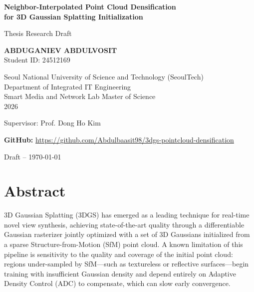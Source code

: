 \documentclass[12pt, a4paper]{article}
\begin{document}
\onehalfspacing

\begin{titlepage}
\centering
\vspace*{2cm}

{\Large\bfseries\color{seoulblue}
Neighbor-Interpolated Point Cloud Densification\\[0.5em]
for 3D Gaussian Splatting Initialization}

\vspace{1.5cm}
{\large Thesis Research Draft}

\vspace{2cm}
{\Large\bfseries ABDUGANIEV ABDULVOSIT}\\[0.5em]
{\normalsize Student ID: 24512169}

\vspace{1cm}
{\normalsize
Seoul National University of Science and Technology (SeoulTech)\\
Department of Integrated IT Engineering\\Smart Media and Network Lab
Master of Science\\
2026}

\vspace{1.5cm}
{\normalsize Supervisor: Prof. Dong Ho Kim}

\vspace{2cm}
{\normalsize
\textbf{GitHub:}
\url{https://github.com/Abdulbaasit98/3dgs-pointcloud-densification}}

\vfill
{\small Draft -- \today}
\end{titlepage}

\tableofcontents
\newpage

\section*{Abstract}

3D Gaussian Splatting (3DGS) has emerged as a leading technique for real-time novel
view synthesis, achieving state-of-the-art quality through a differentiable Gaussian
rasterizer jointly optimized with a set of 3D Gaussians initialized from a sparse
Structure-from-Motion (SfM) point cloud. A known limitation of this pipeline is
sensitivity to the quality and coverage of the initial point cloud: regions
under-sampled by SfM---such as textureless or reflective surfaces---begin training
with insufficient Gaussian density and depend entirely on Adaptive Density Control
(ADC) to compensate, which can slow early convergence.
\end{document}
